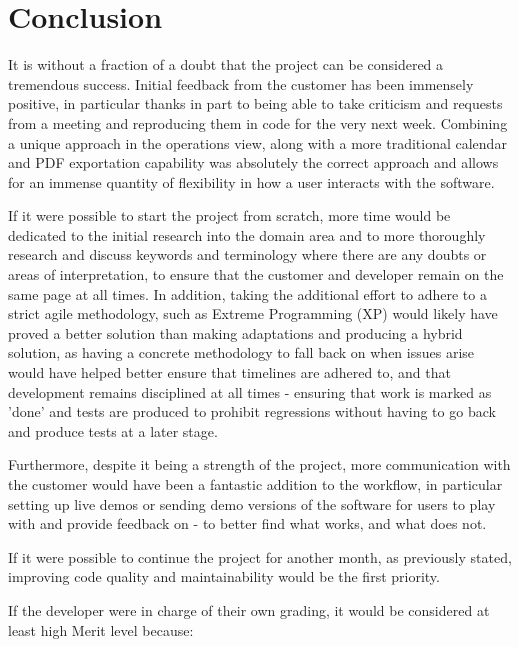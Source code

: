 \chapter{Conclusion}

It is without a fraction of a doubt that the project can be considered a tremendous success. Initial feedback from the customer has been immensely positive, in particular thanks in part to being able to take criticism and requests from a meeting and reproducing them in code for the very next week. Combining a unique approach in the operations view, along with a more traditional calendar and PDF exportation capability was absolutely the correct approach and allows for an immense quantity of flexibility in how a user interacts with the software.

If it were possible to start the project from scratch, more time would be dedicated to the initial research into the domain area and to more thoroughly research and discuss keywords and terminology where there are any doubts or areas of interpretation, to ensure that the customer and developer remain on the same page at all times. In addition, taking the additional effort to adhere to a strict agile methodology, such as Extreme Programming (XP) would likely have proved a better solution than making adaptations and producing a hybrid solution, as having a concrete methodology to fall back on when issues arise would have helped better ensure that timelines are adhered to, and that development remains disciplined at all times - ensuring that work is marked as 'done' and tests are produced to prohibit regressions without having to go back and produce tests at a later stage.

Furthermore, despite it being a strength of the project, more communication with the customer would have been a fantastic addition to the workflow, in particular setting up live demos or sending demo versions of the software for users to play with and provide feedback on - to better find what works, and what does not.

If it were possible to continue the project for another month, as previously stated, improving code quality and maintainability would be the first priority.

If the developer were in charge of their own grading, it would be considered at least high Merit level because:


